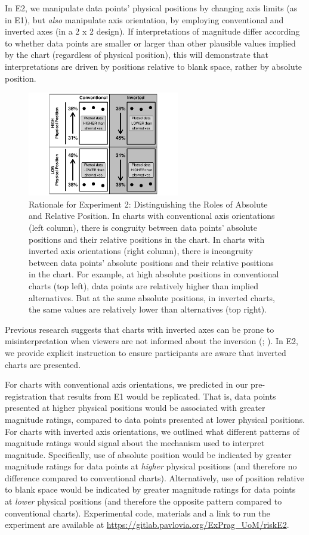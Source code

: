 \documentclass[journal]{vgtc}                %
\begin{document}
In E2, we manipulate data points' physical positions by changing axis
limits (as in E1), but \emph{also} manipulate axis orientation, by employing
conventional and inverted axes (in a 2 x 2 design). If interpretations
of magnitude differ according to whether data points are smaller or
larger than other plausible values implied by the chart (regardless of
physical position), this will demonstrate that interpretations are
driven by positions relative to blank space, rather by absolute
position.

\begin{figure}
\includegraphics[width=250px]{position_magnitude_files/figure-latex/r2-rationale-plot-1} \caption{Rationale for Experiment 2: Distinguishing the Roles of Absolute and Relative Position. 
 In charts with conventional axis orientations (left column), there is congruity between data points’ absolute positions and their relative positions in the chart. 
 In charts with inverted axis orientations (right column), there is incongruity between data points’ absolute positions and their relative positions in the chart. 
 For example, at high absolute positions in conventional charts (top left), data points are relatively higher than implied alternatives. But at the same absolute positions, in inverted charts, the same values are relatively lower than alternatives (top right).}\label{fig:r2-rationale-plot}
\end{figure}

Previous research suggests that charts with inverted axes can be prone
to misinterpretation when viewers are not informed about the inversion
(\citet{pandey_how_2015}; \citet{woodin_conceptual_2022}). In E2, we provide explicit
instruction to ensure participants are aware that inverted charts are
presented.

For charts with conventional axis orientations,
we predicted in our pre-registration that results from E1 would be replicated. That is, data
points presented at higher physical positions would be associated with
greater magnitude ratings, compared to data points presented at lower
physical positions. For charts with inverted axis orientations, we
outlined what different patterns of magnitude ratings would signal about
the mechanism used to interpret magnitude. Specifically, use of absolute
position would be indicated by greater magnitude ratings for data points
at \emph{higher} physical positions (and therefore no difference compared to
conventional charts). Alternatively, use of position relative to blank
space would be indicated by greater magnitude ratings for data points at
\emph{lower} physical positions (and therefore the opposite pattern compared
to conventional charts). Experimental code, materials and a link to run the experiment are available at \url{https://gitlab.pavlovia.org/ExPrag_UoM/riskE2}.
\end{document}
